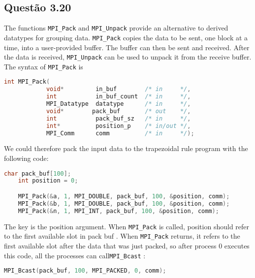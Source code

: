 

\subsection{Questão 3.20}

The functions \texttt{MPI\_Pack} and \texttt{MPI\_Unpack} provide an alternative to derived datatypes for grouping data. \texttt{MPI\_Pack} copies the data to be sent, one block at a time, into a user-provided buffer. The buffer can then be sent and received. After the data is received, \texttt{MPI\_Unpack} can be used to unpack it from the
receive buffer. The syntax of \texttt{MPI\_Pack} is

\begin{lstlisting}[language=C]
      int MPI_Pack(
            void*         in_buf        /* in     */,
            int           in_buf_count  /* in     */,
            MPI_Datatype  datatype      /* in     */,
            void*        pack_buf       /* out    */,
            int           pack_buf_sz   /* in     */,
            int*          position_p    /* in/out */,
            MPI_Comm      comm          /* in     */);
\end{lstlisting}

We could therefore pack the input data to the trapezoidal rule program with
the following code:
\begin{lstlisting}[language=C]
    char pack_buf[100];
    int position = 0;

    MPI_Pack(&a, 1, MPI_DOUBLE, pack_buf, 100, &position, comm);
    MPI_Pack(&b, 1, MPI_DOUBLE, pack_buf, 100, &position, comm);
    MPI_Pack(&n, 1, MPI_INT, pack_buf, 100, &position, comm);
\end{lstlisting}

The key is the position argument. When \texttt{MPI\_Pack} is called, position should
refer to the first available slot in pack buf . When \texttt{MPI\_Pack} returns, it refers
to the first available slot after the data that was just packed, so after process 0
executes this code, all the processes can call\texttt{MPI\_Bcast} :
\begin{lstlisting}[language=C]
    MPI_Bcast(pack_buf, 100, MPI_PACKED, 0, comm);
\end{lstlisting}

